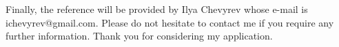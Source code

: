 \documentclass[12pt,a4paper]{moderncv}
\begin{document}


Finally, the  reference will be provided by Ilya Chevyrev whose e-mail is ichevyrev@gmail.com.   Please do not hesitate to contact me if you require any further information. Thank you for considering my application. %






\vspace{0.5cm}

\makeletterclosing
\end{document}
